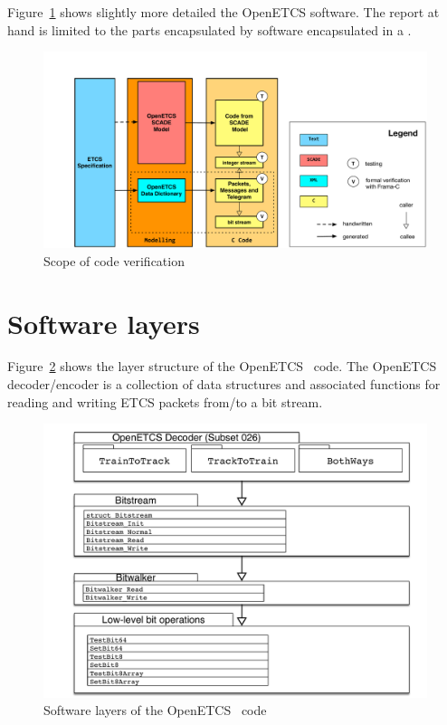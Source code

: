 Figure~\ref{fig:scope-of-code-verification} shows slightly more detailed
the OpenETCS software.
The report at hand is limited to the parts encapsulated by \isoc software encapsulated 
in a .

\clearpage

\begin{figure}[hbt]
\begin{center}
\includegraphics[width=0.95\textheight,angle=90]{figures/OpenETCS-Stack.pdf}
\caption{\label{fig:scope-of-code-verification} Scope of code verification}
\end{center}
\end{figure}

\FloatBarrier

\section{Software layers}

Figure~\ref{fig:software-layers} shows the layer structure of the OpenETCS \isoc~code.
The OpenETCS decoder\slash encoder is a collection of data structures and associated functions
for reading and writing ETCS packets from\slash to a bit stream.

\begin{figure}[hbt]
\begin{center}
\includegraphics[width=1.0\textwidth]{figures/software-layers.pdf}
\caption{\label{fig:software-layers} Software layers of the OpenETCS \isoc~code}
\end{center}
\end{figure}


